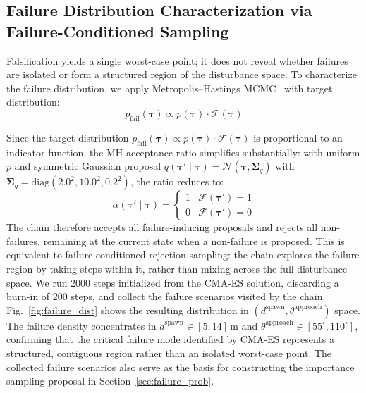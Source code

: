 \documentclass[conference]{IEEEtran}
\begin{document}
\subsection{Failure Distribution Characterization via Failure-Conditioned Sampling}
\label{sec:mcmc}

Falsification yields a single worst-case point; it does not reveal whether failures are isolated or form a structured region of the disturbance space. To characterize the failure distribution, we apply Metropolis--Hastings MCMC~\cite{metropolis1953equation, hastings1970monte} with target distribution:
\begin{equation}
    p_{\text{fail}}(\boldsymbol{\tau}) \propto p(\boldsymbol{\tau}) \cdot \mathcal{F}(\boldsymbol{\tau})
    \label{eq:failure_dist}
\end{equation}


Since the target distribution $p_{\text{fail}}(\boldsymbol{\tau}) \propto p(\boldsymbol{\tau}) \cdot \mathcal{F}(\boldsymbol{\tau})$ is proportional to an indicator function, the MH acceptance ratio simplifies substantially: with uniform $p$ and symmetric Gaussian proposal $q(\boldsymbol{\tau}' \mid \boldsymbol{\tau}) = \mathcal{N}(\boldsymbol{\tau}, \boldsymbol{\Sigma}_q)$ with $\boldsymbol{\Sigma}_q = \mathrm{diag}(2.0^2, 10.0^2, 0.2^2)$, the ratio reduces to:
\begin{equation}
    \alpha(\boldsymbol{\tau}' \mid \boldsymbol{\tau}) = \begin{cases} 1 & \mathcal{F}(\boldsymbol{\tau}') = 1 \\ 0 & \mathcal{F}(\boldsymbol{\tau}') = 0 \end{cases}
\end{equation}
The chain therefore accepts all failure-inducing proposals and rejects all non-failures, remaining at the current state when a non-failure is proposed. This is equivalent to failure-conditioned rejection sampling: the chain explores the failure region by taking steps within it, rather than mixing across the full disturbance space. We run 2000 steps initialized from the CMA-ES solution, discarding a burn-in of 200 steps, and collect the failure scenarios visited by the chain. Fig.~\ref{fig:failure_dist} shows the resulting distribution in $(d^{\text{spawn}}, \theta^{\text{approach}})$ space. The failure density concentrates in $d^{\text{spawn}} \in [5, 14]$\,m and $\theta^{\text{approach}} \in [55^\circ, 110^\circ]$, confirming that the critical failure mode identified by CMA-ES represents a structured, contiguous region rather than an isolated worst-case point. The collected failure scenarios also serve as the basis for constructing the importance sampling proposal in Section~\ref{sec:failure_prob}.
\end{document}
